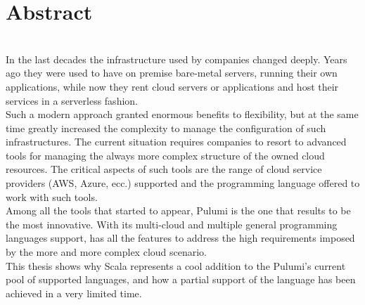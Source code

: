 
{}
{}
\begingroup
\let\clearpage\relax
\let\cleardoublepage\relax
\let\cleardoublepage\relax

\chapter{Abstract}

\\
\newline
In the last decades the infrastructure used by companies changed deeply.
Years ago they were used to have on premise bare-metal servers, running their own applications, while now they rent cloud servers or applications and host their services in a serverless fashion.\\
Such a modern approach granted enormous benefits to flexibility, but at the same time greatly increased the complexity to manage the configuration of such infrastructures.
The current situation requires companies to resort to advanced tools for managing the always more complex structure of the owned cloud resources.
The critical aspects of such tools are the range of cloud service providers (AWS, Azure, ecc.) supported and the programming language offered to work with such tools.\\
Among all the tools that started to appear, Pulumi is the one that results to be the most innovative.
With its multi-cloud and multiple general programming languages support, has all the features to address the high requirements imposed by the more and more complex cloud scenario.\\
This thesis shows why Scala represents a cool addition to the Pulumi's current pool of supported languages, and how a partial support of the language has been achieved in a very limited time.
\newline
\newline
\newline
\newline
\newline
\newline
